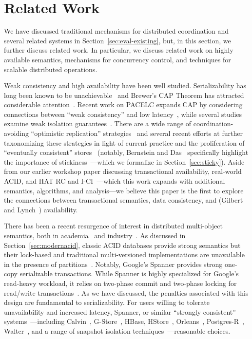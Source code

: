 
\section{Related Work}
\label{sec:relatedwork}

We have discussed traditional mechanisms for distributed
coordination and several related systems in
Section~\ref{sec:eval-existing}, but, in this section, we further discuss
related work. In particular, we discuss related work on highly
available semantics, mechanisms for concurrency control, and
techniques for scalable distributed operations.

Weak consistency and high availability have been well
studied. Serializability has long been known to be
unachievable~\cite{davidson-survey} and Brewer's CAP Theorem has
attracted considerable attention~\cite{gilbert-cap}. Recent work on
PACELC expands CAP by considering connections between ``weak
consistency'' and low latency~\cite{abadi-pacelc}, while several
studies examine weak isolation guarantees~\cite{adya,
  ansicritique}. There are a wide range of coordination-avoiding
``optimistic replication'' strategies~\cite{optimistic} and several
recent efforts at further taxonomizing these strategies in light of
current practice and the proliferation of ``eventually consistent''
stores~\cite{bailis-ec, bernstein-survey} (notably, Bernstein and
Das~\cite{bernstein-survey} specifically highlight the importance of
stickiness~\cite{sessionguarantees, vogels-defs}---which we formalize
in Section~\ref{sec:sticky}).  Aside from our earlier workshop paper
discussing transactional availability, real-world ACID, and HAT RC and
I-CI~\cite{hat-hotos}---which this work expands with additional
semantics, algorithms, and analysis---we believe this paper is the
first to explore the connections between transactional semantics, data
consistency, and (Gilbert and Lynch~\cite{gilbert-cap}) availability.


There has been a recent resurgence of interest in distributed
multi-object semantics, both in academia~\cite{kraska-s3, gstore,
  eiger, walter,calvin, swift} and industry~\cite{orleans,spanner}. As
discussed in Section~\ref{sec:modernacid}, classic ACID databases
provide strong semantics but their lock-based and traditional
multi-versioned implementations are unavailable in the presence of
partitions~\cite{bernstein-book, gray-isolation}. Notably, Google's
Spanner provides strong one-copy serializable transactions. While
Spanner is highly specialized for Google's read-heavy workload, it
relies on two-phase commit and two-phase locking for read/write
transactions~\cite{spanner}. As we have discussed, the penalties
associated with this design are fundamental to serializability. For
users willing to tolerate unavailability and increased latency,
Spanner, or similar ``strongly consistent''
systems~\cite{kemme-classification}---including Calvin~\cite{calvin},
G-Store~\cite{gstore}, HBase, HStore~\cite{hstore},
Orleans~\cite{orleans}, Postgres-R~\cite{kemme-thesis},
Walter~\cite{walter}, and a range of snapshot isolation
techniques~\cite{daudjee-session}---reasonable
choices.

